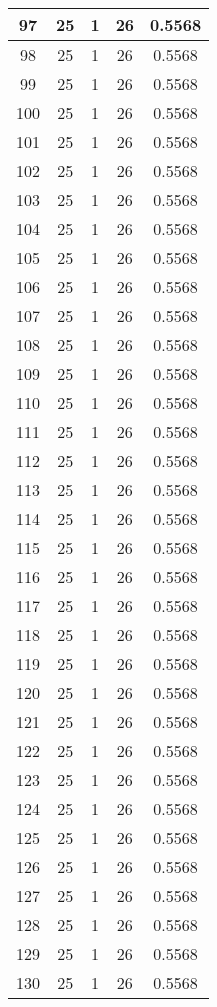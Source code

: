 \documentclass[letterpaper, 12pt]{article}
\begin{document}
\begin{longtable}{|c|c|c|c|c|}
\hline
97 & 25 & 1 & 26 & 0.5568 \\
\hline
98 & 25 & 1 & 26 & 0.5568 \\
\hline
99 & 25 & 1 & 26 & 0.5568 \\
\hline
100 & 25 & 1 & 26 & 0.5568 \\
\hline
101 & 25 & 1 & 26 & 0.5568 \\
\hline
102 & 25 & 1 & 26 & 0.5568 \\
\hline
103 & 25 & 1 & 26 & 0.5568 \\
\hline
104 & 25 & 1 & 26 & 0.5568 \\
\hline
105 & 25 & 1 & 26 & 0.5568 \\
\hline
106 & 25 & 1 & 26 & 0.5568 \\
\hline
107 & 25 & 1 & 26 & 0.5568 \\
\hline
108 & 25 & 1 & 26 & 0.5568 \\
\hline
109 & 25 & 1 & 26 & 0.5568 \\
\hline
110 & 25 & 1 & 26 & 0.5568 \\
\hline
111 & 25 & 1 & 26 & 0.5568 \\
\hline
112 & 25 & 1 & 26 & 0.5568 \\
\hline
113 & 25 & 1 & 26 & 0.5568 \\
\hline
114 & 25 & 1 & 26 & 0.5568 \\
\hline
115 & 25 & 1 & 26 & 0.5568 \\
\hline
116 & 25 & 1 & 26 & 0.5568 \\
\hline
117 & 25 & 1 & 26 & 0.5568 \\
\hline
118 & 25 & 1 & 26 & 0.5568 \\
\hline
119 & 25 & 1 & 26 & 0.5568 \\
\hline
120 & 25 & 1 & 26 & 0.5568 \\
\hline
121 & 25 & 1 & 26 & 0.5568 \\
\hline
122 & 25 & 1 & 26 & 0.5568 \\
\hline
123 & 25 & 1 & 26 & 0.5568 \\
\hline
124 & 25 & 1 & 26 & 0.5568 \\
\hline
125 & 25 & 1 & 26 & 0.5568 \\
\hline
126 & 25 & 1 & 26 & 0.5568 \\
\hline
127 & 25 & 1 & 26 & 0.5568 \\
\hline
128 & 25 & 1 & 26 & 0.5568 \\
\hline
129 & 25 & 1 & 26 & 0.5568 \\
\hline
130 & 25 & 1 & 26 & 0.5568 \\

\end{longtable}
\end{document}
